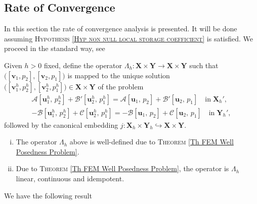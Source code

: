 \documentclass[3p]{elsarticle}
\def\A{{\mathcal A}}
\def\B{{\mathcal B}}
\def\C{{\mathcal C}}
\def\X{\mathbf X}
\def\Y{\mathbf Y}
\def\uone{\mathbf{u}_{1}}
\def\uoneh{\mathbf{u}_{1}^{h}}
\def\utwo{\mathbf{u}_{2}}
\def\utwoh{\mathbf{u}_{2}^{h}}
\def\vone{\mathbf{v}_{1}}
\def\voneh{\mathbf{v}_{1}^{h}}
\def\vtwo{\mathbf{v}_{2}}
\def\vtwoh{\mathbf{v}_{2}^{h}}
\def\pone{p_{1}}
\def\poneh{p_{1}^{h}}
\def\ptwo{p_{2}}
\def\ptwoh{p_{2}^{h}}
\begin{document}
\subsection{Rate of Convergence}\label{Sec Rate of Convergence}
%
%
%
%
In this section the rate of convergence analysis is presented. It will be done assuming \textsc{Hypothesis \ref{Hyp non null local storage coefficient}} is satisfied. We proceed in the standard way, see \cite{GaticaMixed} 
%
%
\begin{definition}\label{Def Projection Operator}
Given $ h > 0 $ fixed, define the operator $ \Lambda_{h}: \X\times \Y \rightarrow \X\times \Y $ such that $ \big([\vone, \ptwo], [\vtwo, \pone]\big)  $ is mapped to the unique solution $ \big([\voneh, \ptwoh], [\vtwoh, \poneh]\big) \in \X\times \Y $ of the problem 
%
\begin{equation}\label{Eq Projection Operator}
\begin{split}
\A[ \uoneh,\,\ptwoh] + \B ' [ \utwoh,\, \poneh]  
= \A[ \uone,\,\ptwo] + \B ' [ \utwo,\, \pone]  \quad \text{in}\; \X_{h} ' ,\\
%
- \B [ \uoneh,\, \ptwoh]  + \C [ \utwoh,\, \poneh] 
= - \B [ \uone,\, \ptwo]  + \C [ \utwo,\, \pone] \quad \text{in}\; \Y_{h} ' ,
\end{split}
\end{equation}
%
followed by the canonical embedding $ j: \X_{h}\times \Y_{h} \hookrightarrow \X\times \Y  $.
\end{definition}
%
% 
\begin{remark}\label{Rem Projection Operator}
%
\begin{enumerate}[(i)]
\item The operator $ \Lambda_{h} $ above is well-defined due to \textsc{Theorem} \ref{Th FEM Well Posedness Problem}.

\item Due to \textsc{Theorem} \ref{Th FEM Well Posedness Problem}, the operator is $ \Lambda_{h} $ linear, continuous and idempotent.
\end{enumerate}
%
\end{remark} 
%
%
We have the following result
%
%
\end{document}
